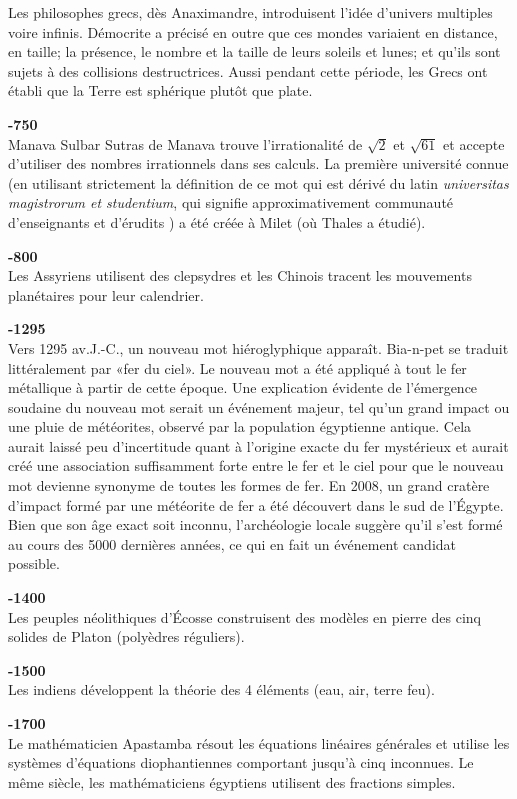 Les philosophes grecs, dès Anaximandre, introduisent l'idée d'univers multiples voire infinis. Démocrite a précisé en outre que ces mondes variaient en distance, en taille; la présence, le nombre et la taille de leurs soleils et lunes; et qu'ils sont sujets à des collisions destructrices. Aussi pendant cette période, les Grecs ont établi que la Terre est sphérique plutôt que plate.

\textbf{-750}\\
Manava Sulbar Sutras de Manava trouve l'irrationalité de $\sqrt{2}$ et $\sqrt{61}$ et accepte d'utiliser des nombres irrationnels dans ses calculs. La première université connue (en utilisant strictement la définition de ce mot qui est dérivé du latin \textit{universitas magistrorum et studentium}, qui signifie approximativement \og communauté d'enseignants et d'érudits \fg{}) a été créée à Milet (où Thales a étudié).

\textbf{-800}\\
Les Assyriens utilisent des clepsydres et les Chinois tracent les mouvements planétaires pour leur calendrier.

\textbf{-1295}\\
Vers 1295 av.J.-C., un nouveau mot hiéroglyphique apparaît. Bia-n-pet se traduit littéralement par «fer du ciel». Le nouveau mot a été appliqué à tout le fer métallique à partir de cette époque. Une explication évidente de l'émergence soudaine du nouveau mot serait un événement majeur, tel qu'un grand impact ou une pluie de météorites, observé par la population égyptienne antique. Cela aurait laissé peu d'incertitude quant à l'origine exacte du fer mystérieux et aurait créé une association suffisamment forte entre le fer et le ciel pour que le nouveau mot devienne synonyme de toutes les formes de fer. En 2008, un grand cratère d'impact formé par une météorite de fer a été découvert dans le sud de l'Égypte. Bien que son âge exact soit inconnu, l'archéologie locale suggère qu'il s'est formé au cours des 5000 dernières années, ce qui en fait un événement candidat possible.

\textbf{-1400}\\
Les peuples néolithiques d'Écosse construisent des modèles en pierre des cinq solides de Platon (polyèdres réguliers).

\textbf{-1500}\\
Les indiens développent la théorie des 4 éléments (eau, air, terre feu).

\textbf{-1700}\\
Le mathématicien Apastamba résout les équations linéaires générales et utilise les systèmes d'équations diophantiennes comportant jusqu'à cinq inconnues. Le même siècle, les mathématiciens égyptiens utilisent des fractions simples.

